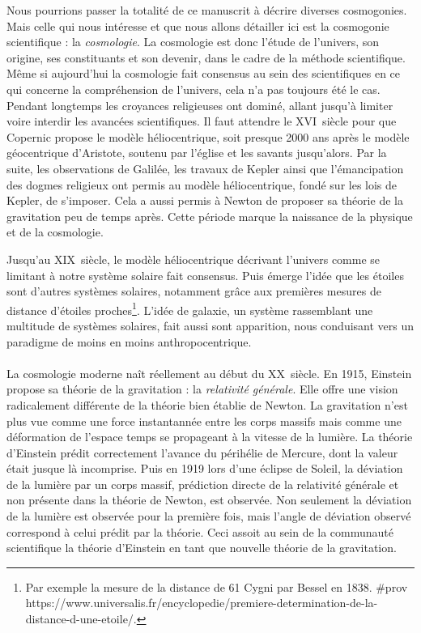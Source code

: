 \documentclass[11pt, twoside, a4paper, openright]{report}
\begin{document}
Nous pourrions passer la totalité de ce manuscrit à décrire diverses cosmogonies. Mais celle qui nous intéresse et que nous allons détailler ici est la cosmogonie scientifique : la \emph{cosmologie}. La cosmologie est donc l'étude de l'univers, son origine, ses constituants et son devenir, dans le cadre de la méthode scientifique. Même si aujourd'hui la cosmologie fait consensus au sein des scientifiques en ce qui concerne la compréhension de l'univers, cela n'a pas toujours été le cas. Pendant longtemps les croyances religieuses ont dominé, allant jusqu'à limiter voire interdir les avancées scientifiques.
Il faut attendre le \textsc{XVI}\ieme~siècle pour que Copernic propose le modèle héliocentrique, soit presque \num{2000} ans après le modèle géocentrique d'Aristote, soutenu par l'église et les savants jusqu'alors.
Par la suite, les observations de Galilée, les travaux de Kepler ainsi que l'émancipation des dogmes religieux ont permis au modèle héliocentrique, fondé sur les lois de Kepler, de s'imposer. Cela a aussi permis à Newton de proposer sa théorie de la gravitation peu de temps après. Cette période marque la naissance de la physique et de la cosmologie.

Jusqu'au \textsc{XIX}\ieme~siècle, le modèle héliocentrique décrivant l'univers comme se limitant à notre système solaire fait consensus. Puis émerge l'idée que les étoiles sont d'autres systèmes solaires, notamment grâce aux premières mesures de distance d'étoiles proches\footnote{Par exemple la mesure de la distance de 61 Cygni par Bessel en 1838. \#prov https://www.universalis.fr/encyclopedie/premiere-determination-de-la-distance-d-une-etoile/.}. L'idée de galaxie, un système rassemblant une multitude de systèmes solaires, fait aussi sont apparition, nous conduisant vers un paradigme de moins en moins anthropocentrique.

\paragraph{}
La cosmologie moderne naît réellement au début du \textsc{XX}\ieme~siècle. En 1915, Einstein propose sa théorie de la gravitation : la \emph{relativité générale}. Elle offre une vision radicalement différente de la théorie bien établie de Newton. La gravitation n'est plus vue comme une force instantannée entre les corps massifs mais comme une déformation de l'espace temps se propageant à la vitesse de la lumière. La théorie d'Einstein prédit correctement l'avance du périhélie de Mercure, dont la valeur était jusque là incomprise. Puis en 1919 lors d'une éclipse de Soleil, la déviation de la lumière par un corps massif, prédiction directe de la relativité générale et non présente dans la théorie de Newton, est observée. Non seulement la déviation de la lumière est observée pour la première fois, mais l'angle de déviation observé correspond à celui prédit par la théorie. Ceci assoit au sein de la communauté scientifique la théorie d'Einstein en tant que nouvelle théorie de la gravitation.
\end{document}
